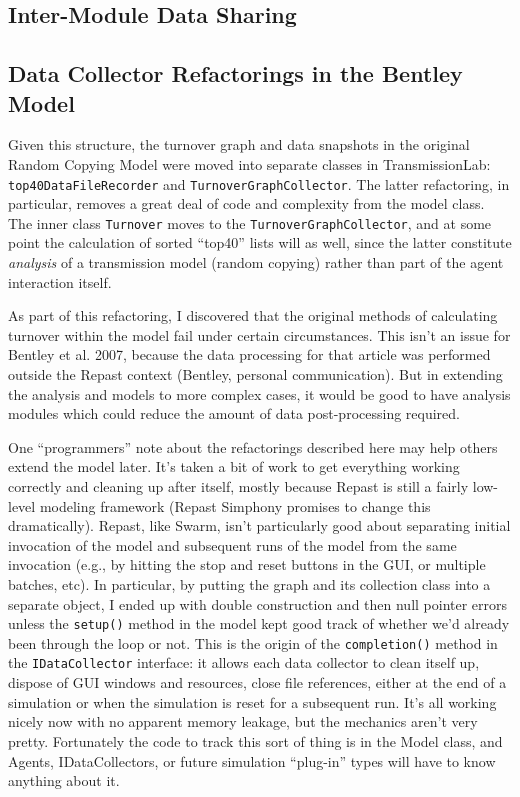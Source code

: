 \documentclass{kluwer-mem-copyright}
\begin{document}
\begin{article}
\subsection{Inter-Module Data Sharing}


\subsection{Data Collector Refactorings in the Bentley Model}
Given this structure, the turnover graph and data snapshots in the original
Random
Copying Model were moved into separate classes in TransmissionLab:\\  \texttt{top40DataFileRecorder}
and \texttt{TurnoverGraphCollector}.  The latter refactoring, in particular,
removes a great deal of code and complexity from the model class. 
The inner class \texttt{Turnover} moves to the \texttt{TurnoverGraphCollector},
and at some point the calculation of sorted ``top40'' lists will as well, since
the latter constitute \emph{analysis} of a transmission model (random copying)
rather than part of the agent interaction itself.

As part of this refactoring, I discovered that the original methods of
calculating turnover within the model fail under certain circumstances.  This
isn't an issue for Bentley et al. 2007, because the data processing for that
article was performed outside the Repast context (Bentley, personal
communication).  But in extending the analysis and models to more complex cases,
it would be good to have analysis modules which could reduce the amount of data
post-processing required.  

One ``programmers'' note about the refactorings described here may help others
extend the model later. It's taken a bit of work to
get everything working correctly and cleaning up after itself, mostly because
Repast is still a fairly low-level modeling framework (Repast Simphony promises
to change this dramatically). Repast, like
Swarm, isn't particularly good about separating initial invocation of the model
and subsequent runs of the model from the same invocation (e.g., by hitting the
stop and reset buttons in the GUI, or multiple batches, etc).  In particular, by
putting the graph and its collection class into a separate object, I ended up
with double construction and then null pointer errors unless the
\texttt{setup()} method in the model kept good track of whether we'd already
been through the loop or not.  This is the origin of the \texttt{completion()}
method in the \texttt{IDataCollector} interface:  it allows each data collector
to clean itself up, dispose of GUI windows and resources, close file references,
either at the end of a simulation or when the simulation is reset for a
subsequent run.  It's all working nicely now with no apparent memory leakage,
but the mechanics aren't very pretty.  Fortunately the code to track this sort of
thing is in the Model class, and Agents, IDataCollectors, or future simulation
``plug-in'' types will have to know anything about it.



\end{article}
\end{document}
